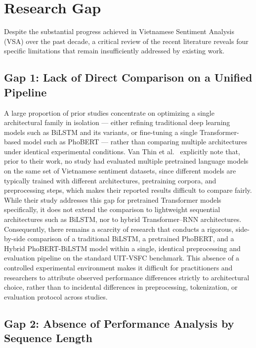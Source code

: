 \documentclass[12pt]{report} %
\begin{document}
\section{Research Gap}

Despite the substantial progress achieved in Vietnamese Sentiment Analysis (VSA) over the past decade, a critical review of the recent literature reveals four specific limitations that remain insufficiently addressed by existing work.

\subsection*{Gap 1: Lack of Direct Comparison on a Unified Pipeline}

A large proportion of prior studies concentrate on optimizing a single architectural family in isolation --- either refining traditional deep learning models such as BiLSTM and its variants, or fine-tuning a single Transformer-based model such as PhoBERT --- rather than comparing multiple architectures under identical experimental conditions. Van Thin et al.\ \cite{thin2023vietnamese} explicitly note that, prior to their work, no study had evaluated multiple pretrained language models on the same set of Vietnamese sentiment datasets, since different models are typically trained with different architectures, pretraining corpora, and preprocessing steps, which makes their reported results difficult to compare fairly. While their study addresses this gap for pretrained Transformer models specifically, it does not extend the comparison to lightweight sequential architectures such as BiLSTM, nor to hybrid Transformer--RNN architectures. Consequently, there remains a scarcity of research that conducts a rigorous, side-by-side comparison of a traditional BiLSTM, a pretrained PhoBERT, and a Hybrid PhoBERT-BiLSTM model within a single, identical preprocessing and evaluation pipeline on the standard UIT-VSFC benchmark. This absence of a controlled experimental environment makes it difficult for practitioners and researchers to attribute observed performance differences strictly to architectural choice, rather than to incidental differences in preprocessing, tokenization, or evaluation protocol across studies.

\subsection*{Gap 2: Absence of Performance Analysis by Sequence Length}
\end{document}
